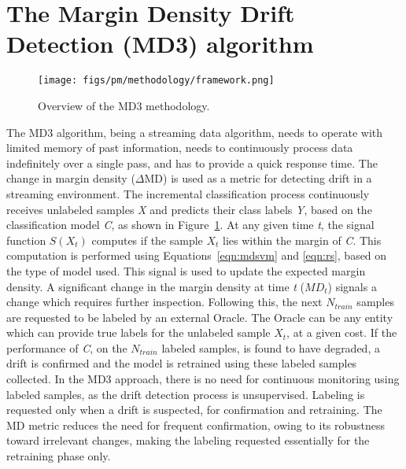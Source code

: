 \documentclass[authoryear,3p,times,twocolumn]{elsarticle}
\begin{document}
\section{The Margin Density Drift Detection (MD3) algorithm}
\label{sec:md3}

\begin{figure}[t]
  \centering
  \texttt{[image: figs/pm/methodology/framework.png]}
   \caption{Overview of the MD3 methodology.}
  \label{fig:framework}
\end{figure}

The MD3 algorithm, being a streaming data algorithm, needs to operate with limited memory of past information, needs to continuously process data indefinitely over a single pass, and has to provide a quick response time. The change in margin density ($\Delta$MD) is used as a metric for detecting drift in a streaming environment. The incremental classification process continuously receives unlabeled samples \textit{X} and predicts their class labels \textit{Y}, based on the classification model \textit{C}, as shown in Figure~\ref{fig:framework}. At any given time \textit{t}, the signal function $S(X_t)$ computes if the sample $X_t$ lies within the margin of \textit{C}. This computation is performed using Equations~\ref{eqn:mdsvm} and \ref{eqn:rs}, based on the type of model used. This signal is used to update the expected margin density. A significant change in the margin density at time \textit{t} ($MD_t$) signals a change which requires further inspection. Following this, the next $N_{train}$ samples are requested to be labeled by an external Oracle. The Oracle can be any entity which can provide true labels for the unlabeled sample $X_t$, at a given cost. If the performance of \textit{C}, on the $N_{train}$ labeled samples, is found to have degraded, a drift is confirmed and the model is retrained using these labeled samples collected. In the MD3 approach, there is no need for continuous monitoring using labeled samples, as the drift detection process is unsupervised. Labeling is requested only when a drift is suspected, for confirmation and retraining. The MD metric reduces the need for frequent confirmation, owing to its robustness toward irrelevant changes, making the labeling requested essentially for the retraining phase only. 
\end{document}
